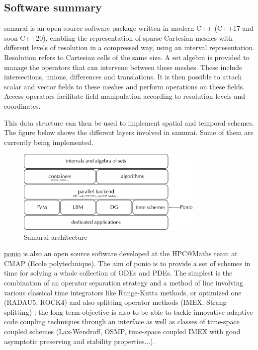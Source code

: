 \subsection{Software summary}
\label{sec:Samurai:summary}

samurai is an open source software package written in modern C++ (C++17 and soon C++20), enabling the representation of sparse Cartesian meshes with different levels of resolution in a compressed way, using an interval representation. Resolution refers to Cartesian cells of the same size. A set algebra is provided to manage the operators that can intervene between these meshes. These include intersections, unions, differences and translations.
It is then possible to attach scalar and vector fields to these meshes and perform operations on these fields. Access operators facilitate field manipulation according to resolution levels and coordinates.

This data structure can then be used to implement spatial and temporal schemes. The figure below shows the different layers involved in samurai. Some of them are currently being implemented.

\begin{figure}[h!]
    \centering
    \includegraphics[width=0.8\textwidth]{graphics/samurai/samurai.png}
    \caption{Samurai architecture}
\end{figure}

\href{https://github.com/hpc-maths/ponio}{ponio} is also an open source software developed at the HPC@Maths team at CMAP (Ecole polytechnique). The aim of ponio is to provide a set of schemes in time for solving a whole collection of ODEs and PDEs. The simplest is the combination of an operator separation strategy and a method of line involving various classical time integrators like Runge-Kutta methods, or optimized one (RADAU5, ROCK4) and also splitting operator methods (IMEX, Strang splitting) ; the long-term objective is also to be able to tackle innovative adaptive code coupling techniques through an interface as well as classes of time-space coupled schemes (Lax-Wendroff, OSMP, time-space coupled IMEX with good asymptotic preserving and stability properties...).

